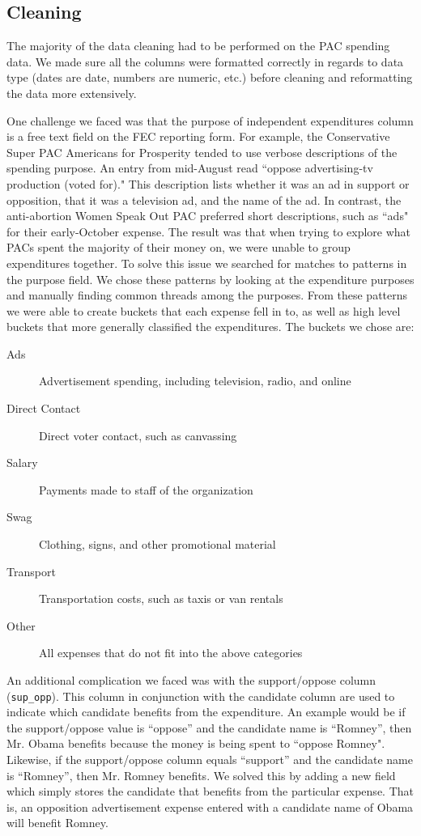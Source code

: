 \documentclass[11pt]{article}\usepackage{graphicx, color}
\begin{document}
\subsection{Cleaning}
The majority of the data cleaning had to be performed on the PAC spending data. We made sure all the columns were formatted correctly in regards to data type (dates are date, numbers are numeric, etc.) before cleaning and reformatting the data more extensively. 

One challenge we faced was that the purpose of independent expenditures column is a free text field on the FEC reporting form. For example, the Conservative Super PAC Americans for Prosperity tended to use verbose descriptions of the spending purpose.  An entry from mid-August read ``oppose advertising-tv production (voted for)."  This description lists whether it was an ad in support or opposition, that it was a television ad, and the name of the ad. In contrast, the anti-abortion Women Speak Out PAC preferred short descriptions, such as ``ads" for their early-October expense. The result was that when trying to explore what PACs spent the majority of their money on, we were unable to group expenditures together. To solve this issue we searched for matches to patterns in the purpose field. We chose these patterns by looking at the expenditure purposes and manually finding common threads among the purposes. From these patterns we were able to create buckets that each expense fell in to, as well as high level buckets that more generally classified the expenditures.  The buckets we chose are: 

\begin{description}
    \item[Ads] Advertisement spending, including television, radio, and online
    \item[Direct Contact] Direct voter contact, such as canvassing
    \item[Salary] Payments made to staff of the organization
    \item[Swag] Clothing, signs, and other promotional material
    \item[Transport] Transportation costs, such as taxis or van rentals
    \item[Other] All expenses that do not fit into the above categories
\end{description}

An additional complication we faced was with the support/oppose column (\texttt{sup\_opp}). This column in conjunction with the candidate column are used to indicate which candidate benefits from the expenditure. An example would be if the support/oppose value is ``oppose'' and the candidate name is ``Romney'', then Mr. Obama benefits because the money is being spent to ``oppose Romney". Likewise, if the support/oppose column equals ``support'' and the candidate name is ``Romney'', then Mr. Romney benefits.  We solved this by adding a new field which simply stores the candidate that benefits from the particular expense.  That is, an opposition advertisement expense entered with a candidate name of Obama will benefit Romney.
\end{document}
